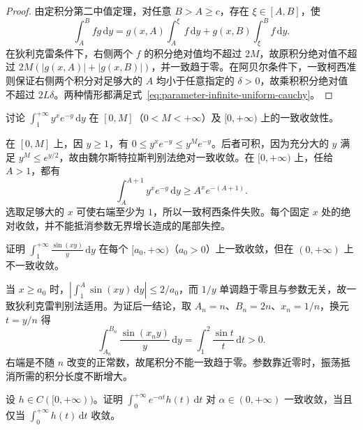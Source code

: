 \documentclass[UTF8,12pt,a4paper,fontset=fandol]{ctexbook}
\begin{document}
\begin{proof}
由定积分第二中值定理，对任意 $B>A\geq c$，存在 $\xi\in[A,B]$，使
\[
    \int_A^B fg\,\mathrm{d}y
    =g(x,A)\int_A^\xi f\,\mathrm{d}y
      +g(x,B)\int_\xi^B f\,\mathrm{d}y.
\]
在狄利克雷条件下，右侧两个 $f$ 的积分绝对值均不超过 $2M$，故原积分绝对值不超过 $2M(|g(x,A)|+|g(x,B)|)$，并一致趋于零。在阿贝尔条件下，一致柯西准则保证右侧两个积分对足够大的 $A$ 均小于任意指定的 $\delta>0$，故乘积积分绝对值不超过 $2L\delta$。两种情形都满足式~\eqref{eq:parameter-infinite-uniform-cauchy}。
\end{proof}

\begin{example}
\label{ex:parameter-exponential-tail-domain}
讨论 $\displaystyle\int_1^{+\infty}y^x e^{-y}\,\mathrm{d}y$ 在 $[0,M]$（$0<M<+\infty$）及 $[0,+\infty)$ 上的一致收敛性。
\end{example}

\begin{solve}
在 $[0,M]$ 上，因 $y\geq1$，有 $0\leq y^x e^{-y}\leq y^M e^{-y}$。后者可积，因为充分大的 $y$ 满足 $y^M\leq e^{y/2}$，故由魏尔斯特拉斯判别法绝对一致收敛。在 $[0,+\infty)$ 上，任给 $A>1$，都有
\[
    \int_A^{A+1}y^x e^{-y}\,\mathrm{d}y
    \geq A^x e^{-(A+1)}.
\]
选取足够大的 $x$ 可使右端至少为 $1$，所以一致柯西条件失败。每个固定 $x$ 处的绝对收敛，并不能抵消参数无界增长造成的尾部失控。
\end{solve}

\begin{example}
\label{ex:parameter-sine-tail-uniformity}
证明 $\displaystyle\int_1^{+\infty}\frac{\sin(xy)}{y}\,\mathrm{d}y$ 在每个 $[a_0,+\infty)$（$a_0>0$）上一致收敛，但在 $(0,+\infty)$ 上不一致收敛。
\end{example}

\begin{solve}
当 $x\geq a_0$ 时，$|\int_1^A\sin(xy)\,\mathrm{d}y|\leq2/a_0$，而 $1/y$ 单调趋于零且与参数无关，故一致狄利克雷判别法适用。为证后一结论，取 $A_n=n$、$B_n=2n$、$x_n=1/n$，换元 $t=y/n$ 得
\[
    \int_{A_n}^{B_n}\frac{\sin(x_ny)}{y}\,\mathrm{d}y
    =\int_1^2\frac{\sin t}{t}\,\mathrm{d}t>0.
\]
右端是不随 $n$ 改变的正常数，故尾积分不能一致趋于零。参数靠近零时，振荡抵消所需的积分长度不断增大。
\end{solve}

\begin{example}
\label{ex:parameter-abel-damping-equivalence}
设 $h\in C([0,+\infty))$。证明 $\int_0^{+\infty}e^{-\alpha t}h(t)\,\mathrm{d}t$ 对 $\alpha\in(0,+\infty)$ 一致收敛，当且仅当 $\int_0^{+\infty}h(t)\,\mathrm{d}t$ 收敛。
\end{example}
\end{document}

